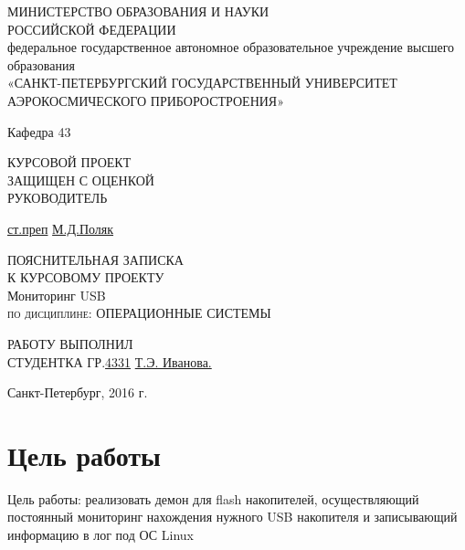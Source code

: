 \documentclass[12pt,a4paper]{scrartcl}
\begin{document}
\begin{titlepage}
  \begin{center}
    \large
    МИНИСТЕРСТВО ОБРАЗОВАНИЯ И НАУКИ \\РОССИЙСКОЙ ФЕДЕРАЦИИ\\
    федеральное государственное автономное образовательное учреждение высшего образования\\
    «САНКТ-ПЕТЕРБУРГСКИЙ ГОСУДАРСТВЕННЫЙ УНИВЕРСИТЕТ 
    АЭРОКОСМИЧЕСКОГО ПРИБОРОСТРОЕНИЯ»

    Кафедра 43   
    \end{center}
	\vfill
	\noindent КУРСОВОЙ ПРОЕКТ
    \normalsize{}\\
    \normalsize{ЗАЩИЩЕН С ОЦЕНКОЙ}\\
    \normalsize{РУКОВОДИТЕЛЬ}
    
    \underline{ст.преп}
    \hspace{5cm}
    \underline{\hspace{4cm}}
    \hspace{4cm}
    \underline{М.Д.Поляк}
    \vfill
    
	\begin{center}
	\normalsize{ПОЯСНИТЕЛЬНАЯ ЗАПИСКА}\\
	\normalsize{К КУРСОВОМУ ПРОЕКТУ}\\
	\vfill
	\normalsize{Мониторинг USB}\\
	\vfill
    \textsc{по дисциплине: ОПЕРАЦИОННЫЕ СИСТЕМЫ}\\
	\end{center}

	\vfill
	\noindent РАБОТУ ВЫПОЛНИЛ
	\normalsize{}\\  
	\normalsize{СТУДЕНТКА ГР.}\hspace{1cm}\underline{4331}
	\hspace{2cm}
	\underline{\hspace{3cm}}
	\hspace{3cm}
	\underline{Т.Э. Иванова.}
\vfill

\begin{center}
  Санкт-Петербург, 2016 г.
\end{center}
\end{titlepage}
\newpage
\tableofcontents %
\newpage
\section{Цель работы}
	\normalsize{Цель работы: реализовать демон для flash накопителей, осуществляющий постоянный мониторинг нахождения нужного USB накопителя и записывающий информацию в лог  под ОС Linux}
\end{document}
